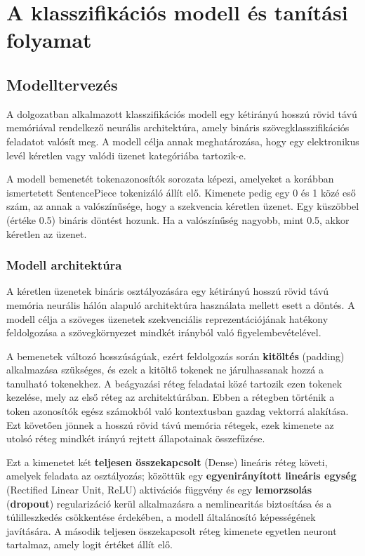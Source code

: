 \chapter{A klasszifikációs modell és tanítási folyamat}

\section{Modelltervezés}

A dolgozatban alkalmazott klasszifikációs modell egy kétirányú hosszú rövid távú memóriával rendelkező neurális architektúra, amely bináris szövegklasszifikációs feladatot valósít meg.
A modell célja annak meghatározása, hogy egy elektronikus levél kéretlen vagy valódi üzenet kategóriába tartozik-e.

A modell bemenetét tokenazonosítók sorozata képezi, amelyeket a korábban ismertetett SentencePiece tokenizáló állít elő. Kimenete pedig egy 0 és 1 közé eső szám, 
az annak a valószínűsége, hogy a szekvencia kéretlen üzenet. Egy küszöbbel (értéke 0.5) bináris döntést hozunk. Ha a valószínűség nagyobb, mint 0.5, akkor kéretlen az üzenet.

\subsection{Modell architektúra}

A kéretlen üzenetek bináris osztályozására egy kétirányú hosszú rövid távú memória neurális hálón alapuló architektúra használata mellett esett a döntés. 
A modell célja a szöveges üzenetek szekvenciális reprezentációjának hatékony feldolgozása a szövegkörnyezet mindkét irányból való figyelembevételével.

A bemenetek változó hosszúságúak, ezért feldolgozás során \textbf{kitöltés} (padding) alkalmazása szükséges, és ezek a kitöltő tokenek ne járulhassanak hozzá a tanulható tokenekhez. 
A beágyazási réteg feladatai közé tartozik ezen tokenek kezelése, mely az első réteg az architektúrában. Ebben a rétegben történik a token azonosítók egész számokból való kontextusban gazdag vektorrá alakítása.
Ezt követően jönnek a hosszú rövid távú memória rétegek, ezek kimenete az utolsó réteg mindkét irányú rejtett állapotainak összefűzése.

Ezt a kimenetet két \textbf{teljesen összekapcsolt} (Dense) lineáris réteg követi, amelyek feladata az osztályozás; közöttük egy \textbf{egyenirányított lineáris egység} (Rectified Linear Unit, ReLU) aktivációs függvény 
és egy \textbf{lemorzsolás} (\textbf{dropout}) regularizáció kerül alkalmazásra a nemlinearitás biztosítása és a túlilleszkedés csökkentése érdekében, a modell általánosító képességének javítására. A második 
teljesen összekapcsolt réteg kimenete egyetlen neuront tartalmaz, amely logit értéket állít elő.


